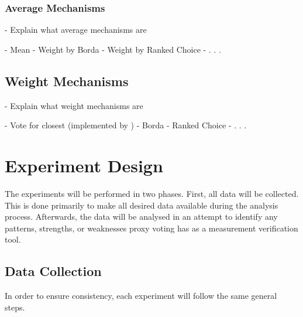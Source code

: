 \subsubsection{Average Mechanisms}\label{subsubsec:average-mechanisms}
- Explain what average mechanisms are

- Mean
- Weight by Borda
- Weight by Ranked Choice
- . . .

\subsection{Weight Mechanisms}\label{subsec:weight-mechanisms}
- Explain what weight mechanisms are

- Vote for closest (implemented by \cite{Cohensius2017})
- Borda
- Ranked Choice
- . . .


\section{Experiment Design}\label{sec:experiment-design}
The experiments will be performed in two phases.
First, all data will be collected.
This is done primarily to make all desired data available during the analysis
process.
Afterwards, the data will be analysed in an attempt to identify any patterns,
strengths, or weaknesses proxy voting has as a measurement verification tool.

\subsection{Data Collection}\label{subsec:data-collection}
In order to ensure consistency, each experiment will follow the same general
steps.

